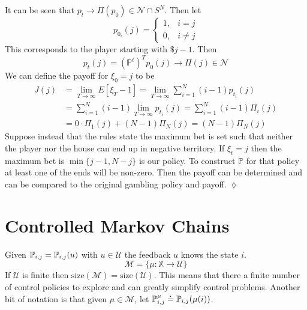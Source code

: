 \begin{example}
It can be seen that $p_t\rightarrow \Pi(p_0)\in\mathcal{N}\cap S^N$.
Then let
$$p_{0_i}(j) = \begin{cases} 1, & i=j \\ 0, & i\neq j \end{cases}$$
This corresponds to the player starting with $\$j-1$.
Then
$$p_t(j) = {(\mathbb{P}^t)}^T p_0(j) \rightarrow \Pi(j)\in\mathcal{N}$$
We can define the payoff for $\xi_0=j$ to be
\begin{align*}
J(j) &= \lim_{T\to\infty}E[\xi_T-1] = \lim_{T\to\infty}\sum_{i=1}^N (i-1)p_{t_i}(j) \\
&= \sum_{i=1}^N (i-1)\lim_{T\to\infty} p_{t_i}(j) = \sum_{i=1}^N (i-1) \Pi_i(j) \\
&= 0\cdot \Pi_1(j) + (N-1)\Pi_N(j) = (N-1)\Pi_N(j)
\end{align*}
Suppose instead that the rules state the maximum bet is set such that neither the player nor the house can end up in negative territory.
If $\xi_t=j$ then the maximum bet is $\min\{j-1,N-j\}$ is our policy.
To construct $\mathbb{P}$ for that policy at least one of the ends will be non-zero.
Then the payoff can be determined and can be compared to the original gambling policy and payoff.
$\lozenge$
\end{example}

\section{Controlled Markov Chains}
Given $\mathbb{P}_{i,j}=\mathbb{P}_{i,j}(u)$ with $u\in\mathcal{U}$ the feedback $u$ knows the state $i$.
$$\mathcal{M}=\{\mu:\mathbb{X}\rightarrow\mathcal{U}\}$$
If $\mathcal{U}$ is finite then $\text{size}(\mathcal{M})=\text{size}(\mathcal{U})$.
This means that there a finite number of control policies to explore and can greatly simplify control problems.
Another bit of notation is that given $\mu\in\mathcal{M}$, let $\mathbb{P}_{i,j}^\mu \doteq \mathbb{P}_{i,j}(\mu(i))$.

